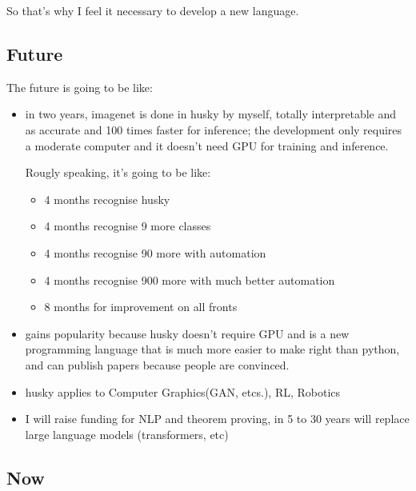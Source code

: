 \documentclass[11pt, oneside]{article}   	%
\theoremstyle{definition}
\begin{document}
So that's why I feel it necessary to develop a new language.

\subsection{Future}


The future is going to be like:

\begin{itemize}
	\item in two years, imagenet is done in husky by myself, totally interpretable and as accurate and 100 times faster for inference; the development only requires a moderate computer and it doesn't need GPU for training and inference.

	Rougly speaking, it's going to be like:
		\begin{itemize}
			\item 4 months recognise husky
			\item 4 months recognise 9 more classes
			\item 4 months recognise 90 more with automation
			\item 4 months recognise 900 more with much better automation
			\item 8 months for improvement on all fronts
		\end{itemize}
	\item gains popularity because husky doesn't require GPU and is a new programming language that is much more easier to make right than python, and can publish papers because people are convinced.
	\item husky applies to Computer Graphics(GAN, etcs.), RL, Robotics
	\item I will raise funding for NLP and theorem proving, in 5 to 30 years will replace large language models (transformers, etc)
\end{itemize}

\subsection{Now}
\end{document}
